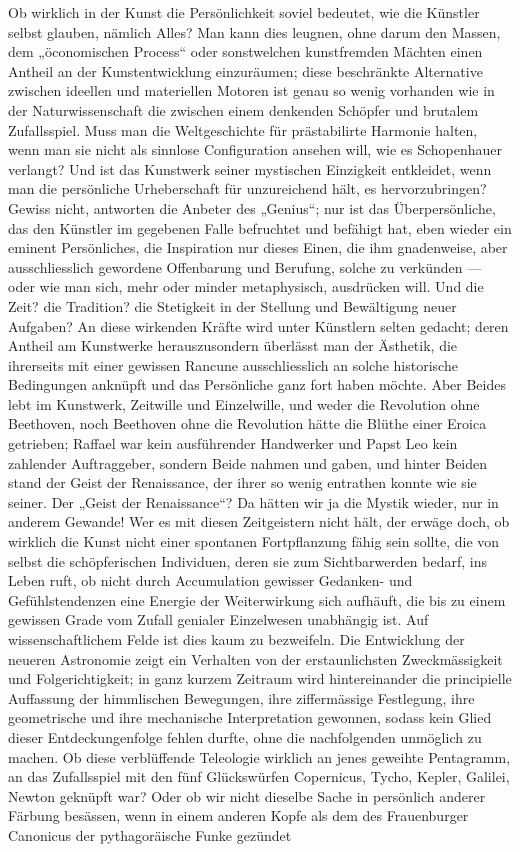 Ob wirklich in der Kunst die Persönlichkeit soviel bedeutet, wie die Künstler selbst glauben, nämlich Alles? Man kann dies leugnen, ohne darum den Massen, dem „öconomischen Process“ oder sonstwelchen kunstfremden Mächten einen Antheil an der Kunstentwicklung einzuräumen; diese beschränkte Alternative zwischen ideellen und materiellen Motoren ist genau so wenig vorhanden wie in der Naturwissenschaft die zwischen einem denkenden Schöpfer und brutalem Zufallsspiel. Muss man die Weltgeschichte für prästabilirte Harmonie halten, wenn man sie nicht als sinnlose Configuration ansehen will, wie es Schopenhauer verlangt? Und ist das Kunstwerk seiner mystischen Einzigkeit entkleidet, wenn man die persönliche Urheberschaft für unzureichend hält, es hervorzubringen? Gewiss nicht, antworten die Anbeter des „Genius“; nur ist das Überpersönliche, das den Künstler im gegebenen Falle befruchtet und befähigt hat, eben wieder ein eminent Persönliches, die Inspiration nur dieses Einen, die ihm gnadenweise, aber ausschliesslich gewordene Offenbarung und Berufung, solche zu verkünden — oder wie man sich, mehr oder minder metaphysisch, ausdrücken will. Und die Zeit? die Tradition? die Stetigkeit in der Stellung und Bewältigung neuer Aufgaben? An diese wirkenden Kräfte wird unter Künstlern selten gedacht; deren Antheil am Kunstwerke herauszusondern überlässt man der Ästhetik, die ihrerseits mit einer gewissen Rancune ausschliesslich an solche historische Bedingungen anknüpft und das Persönliche ganz fort haben möchte. Aber Beides lebt im Kunstwerk, Zeitwille und Einzelwille, und weder die Revolution ohne Beethoven, noch Beethoven ohne die Revolution hätte die Blüthe einer Eroica getrieben; Raffael war kein ausführender Handwerker und Papst Leo kein zahlender Auftraggeber, sondern Beide nahmen und gaben, und hinter Beiden stand der Geist der Renaissance, der ihrer so wenig entrathen konnte wie sie seiner. Der „Geist der Renaissance“? Da hätten wir ja die Mystik wieder, nur in anderem Gewande! Wer es mit diesen Zeitgeistern nicht hält, der erwäge doch, ob wirklich die Kunst nicht einer spontanen Fortpflanzung fähig sein sollte, die von selbst die schöpferischen Individuen, deren sie zum Sichtbarwerden bedarf, ins Leben ruft, ob nicht durch Accumulation gewisser Gedanken- und Gefühlstendenzen eine Energie der Weiterwirkung sich aufhäuft, die bis zu einem gewissen Grade vom Zufall genialer Einzelwesen unabhängig ist. Auf wissenschaftlichem Felde ist dies kaum zu bezweifeln. Die Entwicklung der neueren Astronomie zeigt ein Verhalten von der erstaunlichsten Zweckmässigkeit und Folgerichtigkeit; in ganz kurzem Zeitraum wird hintereinander die principielle Auffassung der himmlischen Bewegungen, ihre ziffermässige Festlegung, ihre geometrische und ihre mechanische Interpretation gewonnen, sodass kein Glied dieser Entdeckungenfolge fehlen durfte, ohne die nachfolgenden unmöglich zu machen. Ob diese verblüffende Teleologie wirklich an jenes geweihte Pentagramm, an das Zufallsspiel mit den fünf Glückswürfen Copernicus, Tycho, Kepler, Galilei, Newton geknüpft war? Oder ob wir nicht dieselbe Sache in persönlich anderer Färbung besässen, wenn in einem anderen Kopfe als dem des Frauenburger Canonicus der pythagoräische Funke gezündet 